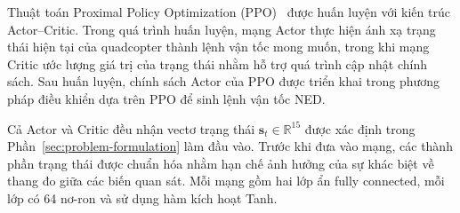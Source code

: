 Thuật toán Proximal Policy Optimization (PPO)~\cite{b20} được huấn luyện với kiến trúc Actor--Critic. Trong quá trình huấn luyện, mạng Actor thực hiện ánh xạ trạng thái hiện tại của quadcopter thành lệnh vận tốc mong muốn, trong khi mạng Critic ước lượng giá trị của trạng thái nhằm hỗ trợ quá trình cập nhật chính sách. Sau huấn luyện, chính sách Actor của PPO được triển khai trong phương pháp điều khiển dựa trên PPO để sinh lệnh vận tốc NED.

Cả Actor và Critic đều nhận vectơ trạng thái \(\mathbf{s}_t \in \mathbb{R}^{15}\) được xác định trong Phần~\ref{sec:problem-formulation} làm đầu vào. Trước khi đưa vào mạng, các thành phần trạng thái được chuẩn hóa nhằm hạn chế ảnh hưởng của sự khác biệt về thang đo giữa các biến quan sát. Mỗi mạng gồm hai lớp ẩn fully connected, mỗi lớp có 64 nơ-ron và sử dụng hàm kích hoạt Tanh.

